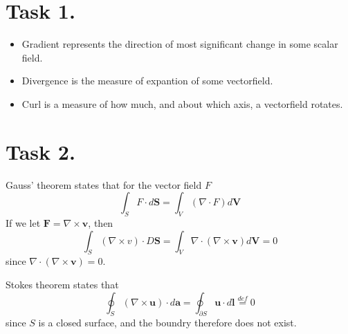\documentclass[a4paper,11pt]{article}
\begin{document}


\section*{Task 1.}
\begin{itemize}
    \item Gradient represents the direction of most significant change in some scalar field.
    \item Divergence is the measure of expantion of some vectorfield.
    \item Curl is a measure of how much, and about which axis, a vectorfield rotates.
\end{itemize}

\section*{Task 2.}
\begin{alphalist}
    \item  Gauss' theorem states that for the vector field $F$
        \[
            \int_{S} F \cdot d\mathbf{S} = \int_{V} (\nabla \cdot F) d\mathbf{V}
        \]
        If we let $\mathbf{F} = \nabla \times \mathbf{v}$, then
        \[
            \int_{S} (\nabla \times v) \cdot D\mathbf{S} = \int_{V} \nabla \cdot (\nabla \times \mathbf{v}) d\mathbf{V} = 0
        \]
        since $\nabla \cdot (\nabla \times \mathbf{v}) = 0$.
    \item Stokes theorem states that
        \[
            \oint_{S}(\nabla \times \mathbf{u}) \cdot d\mathbf{a} = \oint_{\partial S} \mathbf{u} \cdot d\mathbf{l} \overset{def}{=} 0
        \]
        since $S$ is a closed surface, and the boundry therefore does not exist.
\end{alphalist}
\end{document}
